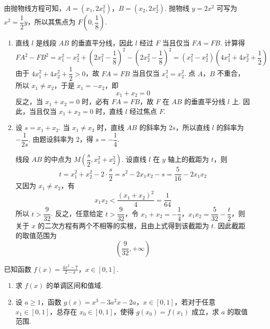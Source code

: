 \begin{solution}
由抛物线方程可知，\(A=(x_{1},2x_{1}^{2})\)，\(B=(x_{2},2x_{2}^{2})\). 抛物线 \(y=2x^{2}\) 可写为 \(x^{2}=\dfrac{1}{2}y\)，所以其焦点为 \(F\left(0,\dfrac{1}{8}\right)\).

\begin{enumerate}
\item 直线 \(l\) 是线段 \(AB\) 的垂直平分线，因此 \(l\) 经过 \(F\) 当且仅当 \(FA=FB\). 计算得
\[
FA^{2}-FB^{2}=x_{1}^{2}-x_{2}^{2}+\left(2x_{1}^{2}-\dfrac{1}{8}\right)^{2}-\left(2x_{2}^{2}-\dfrac{1}{8}\right)^{2}=(x_{1}^{2}-x_{2}^{2})\left(4x_{1}^{2}+4x_{2}^{2}+\dfrac{1}{2}\right)
\]
由于 \(4x_{1}^{2}+4x_{2}^{2}+\dfrac{1}{2}>0\)，故 \(FA=FB\) 当且仅当 \(x_{1}^{2}=x_{2}^{2}\). 点 \(A\)，\(B\) 不重合，所以 \(x_{1}\neq x_{2}\)，于是 \(x_{1}=-x_{2}\)，即
\[
x_{1}+x_{2}=0
\]
反之，当 \(x_{1}+x_{2}=0\) 时，必有 \(FA=FB\)，故 \(F\) 在 \(AB\) 的垂直平分线 \(l\) 上. 因此，当且仅当 \(x_{1}+x_{2}=0\) 时，直线 \(l\) 经过焦点 \(F\).

\item 设 \(s=x_{1}+x_{2}\). 当 \(x_{1}\neq x_{2}\) 时，直线 \(AB\) 的斜率为 \(2s\)，所以直线 \(l\) 的斜率为 \(-\dfrac{1}{2s}\). 由题设斜率为 \(2\)，得 \(s=-\dfrac{1}{4}\).

线段 \(AB\) 的中点为 \(M\left(\dfrac{s}{2},x_{1}^{2}+x_{2}^{2}\right)\). 设直线 \(l\) 在 \(y\) 轴上的截距为 \(t\)，则
\[
t=x_{1}^{2}+x_{2}^{2}-2\cdot\dfrac{s}{2}=s^{2}-2x_{1}x_{2}-s=\dfrac{5}{16}-2x_{1}x_{2}
\]
又因为 \(x_{1}\neq x_{2}\)，有
\[
x_{1}x_{2}<\dfrac{(x_{1}+x_{2})^{2}}{4}=\dfrac{1}{64}
\]
所以 \(t>\dfrac{9}{32}\). 反之，任意给定 \(t>\dfrac{9}{32}\)，令 \(x_{1}+x_{2}=-\dfrac14\)，\(x_{1}x_{2}=\dfrac{5}{32}-\dfrac{t}{2}\)，则关于 \(x\) 的二次方程有两个不相等的实根，且由上式得到该截距为 \(t\). 因此截距的取值范围为
\[
\left(\dfrac{9}{32},+\infty\right)
\]
\end{enumerate}
\end{solution}

\begin{problem}
已知函数 \(f(x) = \frac{4x^2 - 7}{2 - x}\)，\(x \in [0,1]\).

\begin{enumerate}
\item 求 \( f(x) \) 的单调区间和值域.
\item 设 \(a \geqslant 1\)，函数 \(g(x) = x^3 - 3a^2x - 2a\)，\(x \in [0,1]\)，若对于任意 \(x_1 \in [0,1]\)，总存在 \(x_0 \in [0,1]\)，使得 \(g(x_0) = f(x_1)\) 成立，求 \(a\) 的取值范围.
\end{enumerate}
\end{problem}

